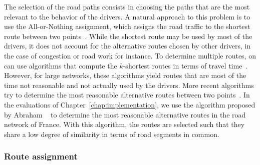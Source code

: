 The selection of the road paths consists in choosing the paths that are the most relevant to the behavior of the drivers. A natural approach to this problem is to use the All-or-Nothing assignment, which assigns the road traffic to the shortest route between two points~\cite{dijkstra1959note,delling2009engineering,hart1968formal}. While the shortest route may be used by most of the drivers, it does not account for the alternative routes chosen by other drivers, in the case of congestion or road work for instance. To determine multiple routes, on can use algorithms that compute the $k$-shortest routes in terms of travel time~\cite{yen1971finding,eppstein1998finding}. However, for large networks, these algorithms yield routes that are most of the time not reasonable and not actually used by the drivers. More recent algorithms try to determine the most reasonable alternative routes between two points~\cite{geisberger2010route,abraham2013alternative}. In the evaluations of Chapter~\ref{chap:implementation}, we use the algorithm proposed by Abraham \etal~\cite{abraham2013alternative} to determine the most reasonable alternative routes in the road network of France. With this algorithm, the routes are selected such that they share a low degree of similarity in terms of road segments in common. 

\subsubsection{Route assignment}
\label{sec:route-assignment}

